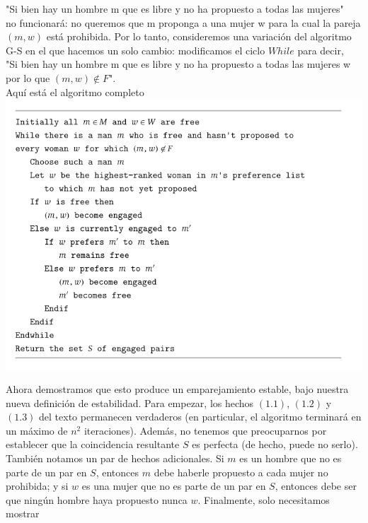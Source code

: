 \documentclass[a4paper]{article}
\begin{document}
"Si bien hay un hombre m que es libre y no ha propuesto a todas las mujeres"\\

no funcionará: no queremos que m proponga a una mujer w para la cual la pareja $(m,w)$ está prohibida. Por lo tanto, consideremos una variación del algoritmo G-S en el que hacemos un solo cambio: modificamos el ciclo $While$ para decir,\\

"Si bien hay un hombre m que es libre y no ha propuesto a todas las mujeres w por lo que $(m, w)∉F$".\\

Aquí está el algoritmo completo\\

\includegraphics[scale=0.7]{Imagenes-Seccion1/cod1-1.PNG}

Ahora demostramos que esto produce un emparejamiento estable, bajo nuestra nueva definición de estabilidad.
Para empezar, los hechos $(1.1)$, $(1.2)$ y $(1.3)$ del texto permanecen verdaderos (en particular, el algoritmo terminará en un máximo de $n^{2}$ iteraciones). Además, no tenemos que preocuparnos por establecer que la coincidencia resultante $S$ es perfecta (de hecho, puede no serlo). También notamos un par de hechos adicionales. Si $m$ es un hombre que no es parte de un par en $S$, entonces $m$ debe haberle propuesto a cada mujer no prohibida; y si $w$ es una mujer que no es parte de un par en $S$, entonces debe ser que ningún hombre haya propuesto nunca $w$. Finalmente, solo necesitamos mostrar\\
\end{document}
